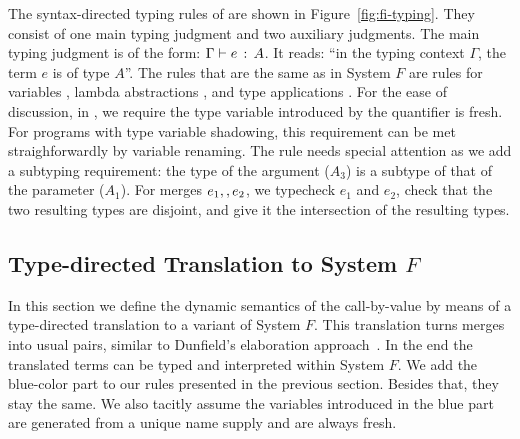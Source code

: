 The syntax-directed typing rules of \name are shown in
Figure~\ref{fig:fi-typing}. They consist of one main typing judgment and two
auxiliary judgments. The main typing judgment is of the form: $ \Gamma \vdash e \ \!:\! \ A $. It reads: ``in the typing context $\Gamma$, the term $e$ is of type
$A$''. The rules that are the same as in System $F$ are rules for variables
, lambda abstractions , and type applications
. For the ease of discussion, in , we require
the type variable introduced by the quantifier is fresh. For programs with type
variable shadowing, this requirement can be met straighforwardly by variable
renaming. The rule  needs special attention as we add a subtyping
requirement: the type of the argument ($A_3$) is a subtype of that of the
parameter ($A_1$).
For merges $e_1 ,, e_2$, we typecheck $e_1$ and $e_2$, check that the two
resulting types are disjoint, and give it the intersection of the resulting
types.


\subsection{Type-directed Translation to System $ F $}

In this section we define the dynamic semantics of the call-by-value \name by
means of a type-directed translation to a variant of System $F$. This
translation turns merges into usual pairs, similar to Dunfield's elaboration
approach~\cite{dunfield2014elaborating}. In the end the translated terms can be typed and interpreted
within System $F$. We add the blue-color part to our rules presented in the
previous section. Besides that, they stay the same. We also tacitly assume the
variables introduced in the blue part are generated from a unique name supply and
are always fresh.

